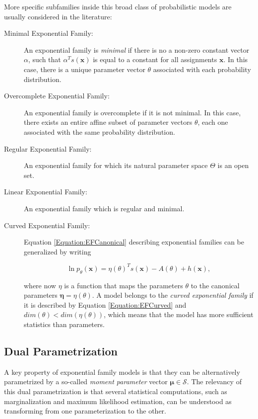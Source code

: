 \documentclass[11pt, oneside]{article}   	%
\newcommand{\bm}{\mathbf}
\numberwithin{figure}{section}
\numberwithin{equation}{section}
\numberwithin{table}{section}
\theoremstyle{definition}
\begin{document}
More specific subfamilies inside this broad class of probabilistic models are usually considered in the literature:

\begin{description}

\item[Minimal  Exponential Family:] An exponential family is \textit{minimal} if there is no a non-zero constant vector $\alpha$, such that $\alpha^Ts(\bm x)$ is equal to a constant for all assignments $\bm x$.  In this case, there is a unique parameter vector $\theta$ associated with each probability distribution.

\item[Overcomplete  Exponential Family:] An exponential family is overcomplete if it is not minimal. In this case, there exists an entire affine subset of parameter vectors $\theta$, each one associated with the same probability distribution.

\item[Regular Exponential Family:] An exponential family for which its natural parameter space $\Theta$ is an open set. 

\item[Linear Exponential Family:] An exponential family which is regular and minimal. 

\item[Curved Exponential Family:] Equation \ref{Equation:EFCanonical} describing exponential families can be generalized by writing 

\begin{equation}
\label{Equation:EFCurved}
\ln p_\theta(\bm x) = \eta(\theta)^T s(\bm x) - A(\theta) + h(\bm x),
\end{equation}

\noindent where now $\eta$ is a function that maps the parameters $\theta$ to the canonical parameters $\bm \eta=\eta(\theta)$. A model belongs to the \textit{curved exponential family} if it is described by Equation \ref{Equation:EFCurved} and $dim(\theta)<dim(\eta(\theta))$, which means that the model has more sufficient statistics than parameters. 

\end{description}

\subsection{Dual Parametrization}
A key property of exponential family models is that they can be alternatively parametrized by a so-called \emph{moment parameter} vector $\bm \mu \in \mathcal{S}$. The relevancy of this dual parametrization is that several statistical computations, such as marginalization and maximum likelihood estimation, can be understood as transforming from one parameterization to the other.  
\end{document}

